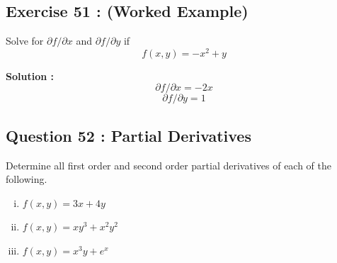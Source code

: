 \documentclass[]{article}
\begin{document}



\subsection*{Exercise 51 : (Worked Example)} 
Solve for $\displaystyle{\partial  f/\partial x}$ and $\displaystyle{\partial f/\partial y}$ if \[f(x,y) = -x^2+y\]

\noindent \textbf{Solution :}
\[ \partial f/\partial x = -2x \]
\[ \partial f/\partial y = 1\]


\subsection*{Question 52 : Partial Derivatives}
Determine all first order and second order partial derivatives of each of the following.
\begin{multicols}{2}
	\begin{enumerate}[(i)]
		
		\item $\displaystyle{f(x, y) = 3x + 4y}$
		
		\item $\displaystyle{f(x, y) = xy^3 + x^2y^2}$
		\item $\displaystyle{f(x, y) = x^3y + e^x}$
		
%		
%		
%		
%		
	\end{enumerate}
\end{multicols}



\newpage

\end{document}
